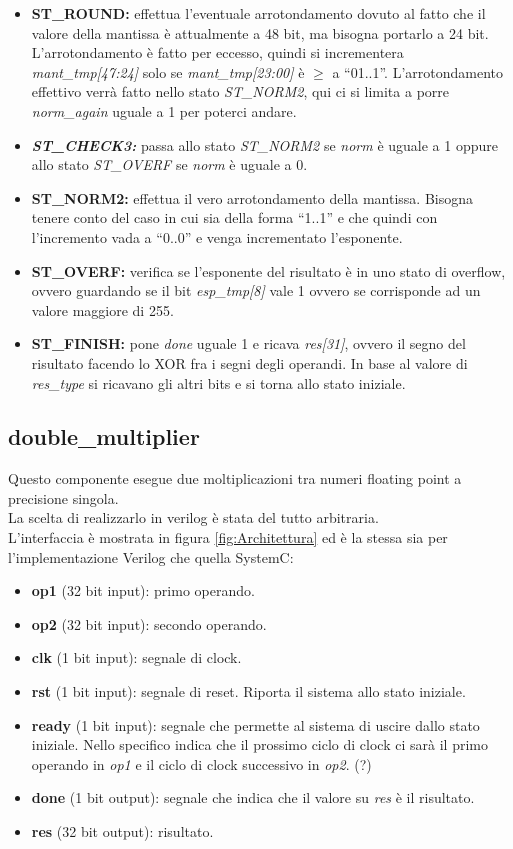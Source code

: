 \documentclass[]{IEEEtran}
\begin{document}
\begin{itemize}
    \item \textbf{ST\_ROUND:} effettua l'eventuale arrotondamento dovuto al fatto che il valore della mantissa è attualmente a 48 bit, ma bisogna portarlo a 24 bit. L'arrotondamento è fatto per eccesso, quindi si incrementera \textit{mant\_tmp[47:24]} solo se \textit{mant\_tmp[23:00]} è $\geq$ a ``01..1''. L'arrotondamento effettivo verrà fatto nello stato \textit{ST\_NORM2}, qui ci si limita a porre \textit{norm\_again} uguale a 1 per poterci andare.
    \item \textit{\textbf{ST\_CHECK3:}} passa allo stato \textit{ST\_NORM2} se \textit{norm} è uguale a 1 oppure allo stato \textit{ST\_OVERF} se \textit{norm} è uguale a 0.
    \item \textbf{ST\_NORM2:} effettua il vero arrotondamento della mantissa. Bisogna tenere conto del caso in cui sia della forma ``1..1'' e che quindi con l'incremento vada a ``0..0'' e  venga incrementato l'esponente.
    \item \textbf{ST\_OVERF:} verifica se l'esponente del risultato è in uno stato di overflow, ovvero guardando se il bit \textit{esp\_tmp[8]} vale 1 ovvero se corrisponde ad un valore maggiore di 255.
    \item \textbf{ST\_FINISH:} pone \textit{done} uguale 1 e ricava \textit{res[31]}, ovvero il segno del risultato facendo lo XOR fra i segni degli operandi. In base al valore di \textit{res\_type} si ricavano gli altri bits e si torna allo stato iniziale.
\end{itemize}


\subsection{double\_multiplier}
Questo componente esegue due moltiplicazioni tra numeri floating point a precisione singola.
\\La scelta di realizzarlo in verilog è stata del tutto arbitraria.
\\L'interfaccia è mostrata in figura \ref{fig:Architettura} ed è la stessa sia per l'implementazione Verilog che quella SystemC:
\begin{itemize}
    \item \textbf{op1} (32 bit input): primo operando.
    \item \textbf{op2} (32 bit input): secondo operando.
    \item \textbf{clk} (1 bit input): segnale di clock.
    \item \textbf{rst} (1 bit input): segnale di reset. Riporta il sistema allo stato iniziale.
    \item \textbf{ready} (1 bit input): segnale che permette al sistema di uscire dallo stato iniziale. Nello specifico indica che il prossimo ciclo di clock ci sarà il primo operando in \textit{op1} e il ciclo di clock successivo in \textit{op2}. (?)
    \item \textbf{done} (1 bit output): segnale che indica che il valore su \textit{res} è il risultato.
    \item \textbf{res} (32 bit output): risultato.
\end{itemize}
    
\end{document}
